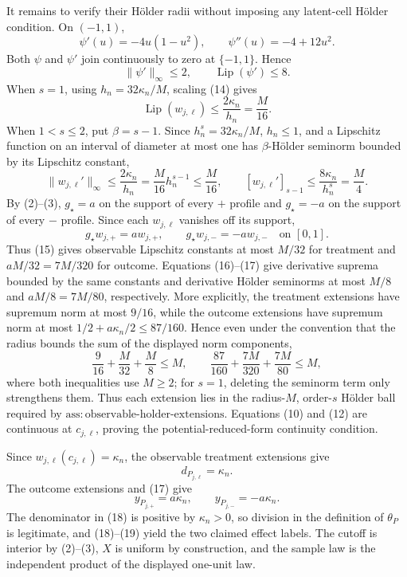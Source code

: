 It remains to verify their H\"older radii without imposing any latent-cell H\"older condition.  On \((-1,1)\),
\[
 \psi'(u)=-4u(1-u^2),
 \qquad
 \psi''(u)=-4+12u^2.
 \tag{13}
\]
Both \(\psi\) and \(\psi'\) join continuously to zero at \(\{-1,1\}\).  Hence
\[
 \lVert\psi'\rVert_\infty\le2,
 \qquad
 \operatorname{Lip}(\psi')\le8.
 \tag{14}
\]
When \(s=1\), using \(h_n=32\kappa_n/M\), scaling (14) gives
\[
 \operatorname{Lip}(w_{j,\ell})
 \le\frac{2\kappa_n}{h_n}=\frac{M}{16}.
 \tag{15}
\]
When \(1<s\le2\), put \(\beta=s-1\).  Since \(h_n^s=32\kappa_n/M\), \(h_n\le1\), and a Lipschitz function on an interval of diameter at most one has \(\beta\)-H\"older seminorm bounded by its Lipschitz constant,
\[
 \lVert w_{j,\ell}'\rVert_\infty
 \le\frac{2\kappa_n}{h_n}
 =\frac{M}{16}h_n^{s-1}\le\frac{M}{16},
 \qquad
 [w_{j,\ell}']_{s-1}
 \le\frac{8\kappa_n}{h_n^s}=\frac{M}{4}.
 \tag{16}
\]
By (2)--(3), \(g_\star=a\) on the support of every \(+\) profile and \(g_\star=-a\) on the support of every \(-\) profile.  Since each \(w_{j,\ell}\) vanishes off its support,
\[
 g_\star w_{j,+}=a w_{j,+},
 \qquad
 g_\star w_{j,-}=-a w_{j,-}
 \quad\text{on }[0,1].
 \tag{17}
\]
Thus (15) gives observable Lipschitz constants at most \(M/32\) for treatment and \(aM/32=7M/320\) for outcome.  Equations (16)--(17) give derivative suprema bounded by the same constants and derivative H\"older seminorms at most \(M/8\) and \(aM/8=7M/80\), respectively.  More explicitly, the treatment extensions have supremum norm at most \(9/16\), while the outcome extensions have supremum norm at most \(1/2+a\kappa_n/2\le87/160\).  Hence even under the convention that the radius bounds the sum of the displayed norm components,
\[
 \frac9{16}+\frac{M}{32}+\frac{M}{8}\le M,
 \qquad
 \frac{87}{160}+\frac{7M}{320}+\frac{7M}{80}\le M,
 \tag{18a}
\]
where both inequalities use \(M\ge2\); for \(s=1\), deleting the seminorm term only strengthens them.  Thus each extension lies in the radius-\(M\), order-\(s\) H\"older ball required by \(\mathrm{ass:observable\mbox{-}holder\mbox{-}extensions}\).  Equations (10) and (12) are continuous at \(c_{j,\ell}\), proving the potential-reduced-form continuity condition.

Since \(w_{j,\ell}(c_{j,\ell})=\kappa_n\), the observable treatment extensions give
\[
 d_{P_{j,\ell}}=\kappa_n.
 \tag{18}
\]
The outcome extensions and (17) give
\[
 y_{P_{j,+}}=a\kappa_n,
 \qquad
 y_{P_{j,-}}=-a\kappa_n.
 \tag{19}
\]
The denominator in (18) is positive by \(\kappa_n>0\), so division in the definition of \(\theta_P\) is legitimate, and (18)--(19) yield the two claimed effect labels.  The cutoff is interior by (2)--(3), \(X\) is uniform by construction, and the sample law is the independent product of the displayed one-unit law.

